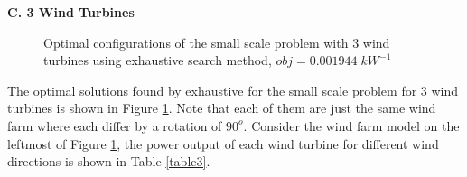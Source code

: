     \textbf{C. 3 Wind Turbines}
        \begin{figure}[H]
            \centering
            \qquad
            \qquad
            \qquad
            \caption{Optimal configurations of the small scale problem with 3 wind turbines using exhaustive search method, $obj=0.001944\;kW^{-1}$}
            \label{small3}
        \end{figure}
        
        The optimal solutions found by exhaustive for the small scale problem for 3 wind turbines is shown in Figure \ref{small3}. Note that each of them are just the same wind farm where each differ by a rotation of $90^o$. Consider the wind farm model on the leftmost of Figure \ref{small3}, the power output of each wind turbine for different wind directions is shown in Table \ref{table3}.
        
